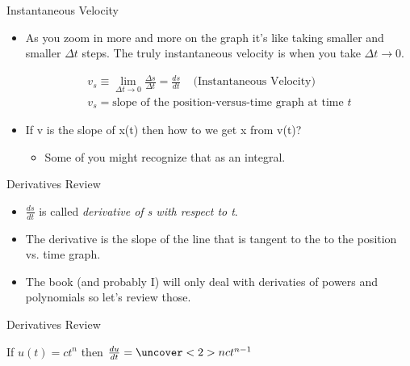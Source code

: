 \documentclass{beamer}
\begin{document}
\begin{frame}{Instantaneous Velocity}
\begin{itemize}
   \item As you zoom in more and more on the graph it's like taking smaller and smaller $\Delta t$ steps. The truly instantaneous velocity is when you take $\Delta t \rightarrow 0$.
   \begin{shaded}
   \begin{align*}
      v_s \equiv \lim\limits_{\Delta t \rightarrow 0} \frac{\Delta s}{\Delta t} = \frac{ds}{dt} ~~~~~ \text{(Instantaneous Velocity)} \\
      v_s = \text{slope of the position-versus-time graph at time $t$}
   \end{align*}
   \end{shaded}
   \item<2-> If v is the slope of x(t) then how to we get x from v(t)?
   \begin{itemize}
      \item<3-> Some of you might recognize that as an integral.
   \end{itemize}
\end{itemize}
\end{frame}

\begin{frame}{Derivatives Review}
\begin{itemize}
   \item $\frac{ds}{dt}$ is called {\it derivative of s with respect to t}.
   \item The derivative is the slope of the line that is tangent to the to the position vs. time graph.
   \item The book (and probably I) will only deal with derivaties of powers and polynomials so let's review those.
\end{itemize}
\end{frame}


\begin{frame}{Derivatives Review}
\begin{center}
   If $u(t)=ct^n$ then $\frac{du}{dt} = \uncover<2>{nct^{n-1}}$
\end{center}
\end{frame}
\end{document}
